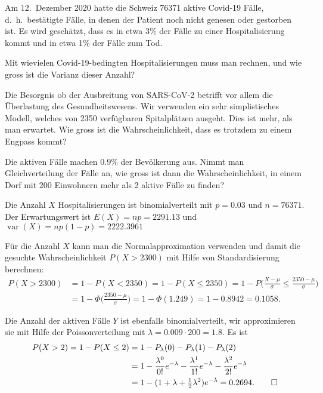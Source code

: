 Am 12.~Dezember 2020 hatte die Schweiz 76371 aktive Covid-19 Fälle,
d.~h.~bestätigte Fälle, in denen der Patient noch nicht genesen oder
gestorben ist.
Es wird geschätzt, dass es in etwa 3\% der Fälle zu einer Hospitalisierung
kommt und in etwa 1\% der Fälle zum Tod.
\begin{teilaufgaben}
\item
Mit wievielen Covid-19-bedingten Hospitalisierungen muss man rechnen, und
wie gross ist die Varianz dieser Anzahl?
\item
Die Besorgnis ob der Ausbreitung von SARS-CoV-2 betrifft vor allem die
Überlastung des Gesundheitswesens.
Wir verwenden ein sehr simplistisches Modell, welches von 2350 
verfügbaren Spitalplätzen ausgeht.
Dies ist mehr, als man erwartet.
Wie gross ist die Wahrscheinlichkeit, dass es trotzdem zu einem Engpass kommt?
\item
Die aktiven Fälle machen 0.9\% der Bevölkerung aus.
Nimmt man Gleichverteilung der Fälle an, wie gross ist dann die
Wahrscheinlichkeit, in einem Dorf mit 200 Einwohnern mehr als 2 
aktive Fälle zu finden?
\end{teilaufgaben}


\begin{loesung}
\begin{teilaufgaben}
\item
Die Anzahl $X$ Hospitalisierungen ist binomialverteilt mit $p=0.03$ und
$n=76371$.
Der Erwartungswert ist $E(X)=np = 2291.13$ und
$\operatorname{var}(X)=np(1-p)=2222.3961$
\item
Für die Anzahl $X$ kann man die Normalapproximation verwenden und damit
die gesuchte Wahrscheinlichkeit $P(X>2300)$ mit Hilfe von Standardisierung
berechnen:
\begin{align*}
P(X>2300)
&=
1-P(X<2350)
=
1-P(X\le 2350)
=
1-P\biggl(\frac{X-\mu}{\sigma}\le \frac{2350-\mu}{\sigma}\biggr)
\\
&=
1-\Phi\biggl(\frac{2350-\mu}{\sigma}\biggr)
=
1-\Phi(1.249)
=
1-0.8942
=
0.1058.
\end{align*}
\item
Die Anzahl der aktiven Fälle $Y$ ist ebenfalls binomialverteilt,
wir approximieren sie mit Hilfe der Poissonverteilung mit
$\lambda = 0.009\cdot 200 = 1.8$.
Es ist
\begin{align*}
P(X > 2)
=
1-P(X\le 2)
&=
1-P_{\lambda}(0)-P_{\lambda}(1)-P_{\lambda}(2)
\\
&=
1-
\frac{\lambda^0}{0!}e^{-\lambda}
-
\frac{\lambda^1}{1!}e^{-\lambda}
-
\frac{\lambda^2}{2!}e^{-\lambda}
\\
&=
1-(1+\lambda+{\textstyle\frac12}\lambda^2)e^{-\lambda}
=
0.2694.
\qedhere
\end{align*}
\end{teilaufgaben}
\end{loesung}

